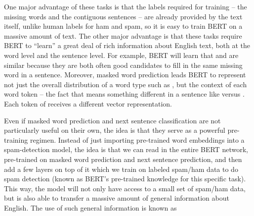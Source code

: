 One major advantage of these tasks is that the labels required for training -- the missing words and the contiguous sentences -- are already provided by the text itself, unlike human labels for ham and spam, so it is easy to train BERT on a massive amount of text.  The other major advantage is that these tasks require BERT to ``learn'' a great deal of rich information about English text, both at the word level and the sentence level.  For example, BERT will learn that  and  are similar because they are both often good candidates to fill in the same missing word in a sentence.  Moreover, masked word prediction leads BERT to represent not just the overall distribution of a word type such as , but the context of each word token -- the fact that  means something different in a sentence like  versus .  Each token of  receives a different vector representation.

Even if masked word prediction and next sentence classification are not particularly useful on their own, the idea is that they serve as a powerful pre-training regimen.  Instead of just importing pre-trained word embeddings into a spam-detection model, the idea is that we can read in the entire BERT network, pre-trained on masked word prediction and next sentence prediction, and then add a few layers on top of it which we train on labeled spam/ham data to do spam detection (known as  BERT's pre-trained knowledge for this specific task).  This way, the model will not only have access to a small set of spam/ham data, but is also able to transfer a massive amount of general information about English.  The use of such general information is known as 


